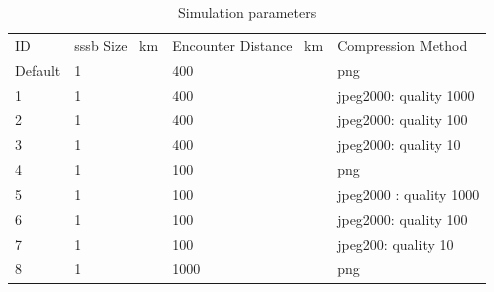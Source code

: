 \begin{table}[htb]
\caption{Simulation parameters}
\label{tab:sim_params}
\begin{tabular}{l|lll}
ID      & \gls{sssb} Size \SI{}{\kilo\meter} & Encounter Distance \SI{}{\kilo\meter} & Compression Method      \\
Default & 1                                                                                                        & 400                                                                                          & png                     \\
1       & 1                                                                                                        & 400                                                                                          & jpeg2000: quality 1000  \\
2       & 1                                                                                                        & 400                                                                                          & jpeg2000: quality 100   \\
3       & 1                                                                                                        & 400                                                                                          & jpeg2000: quality 10    \\
4       & 1                                                                                                        & 100                                                                                          & png                     \\
5       & 1                                                                                                        & 100                                                                                          & jpeg2000 : quality 1000 \\
6       & 1                                                                                                        & 100                                                                                          & jpeg2000: quality 100   \\
7       & 1                                                                                                        & 100                                                                                          & jpeg200: quality 10     \\
8       & 1                                                                                                        & 1000                                                                                         & png                     \\

\end{tabular}
\end{table}
